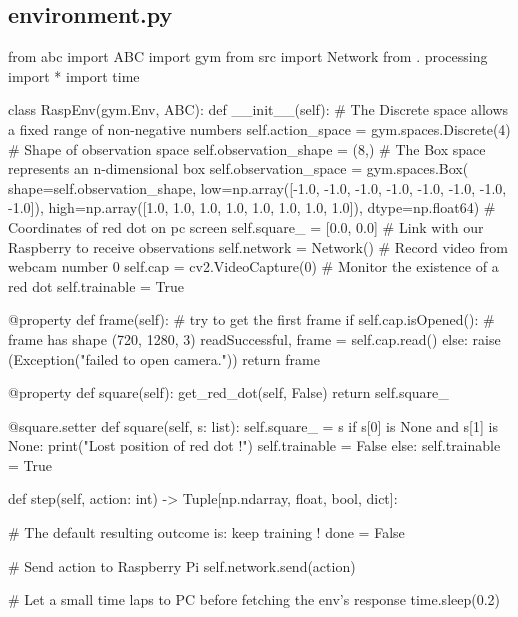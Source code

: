 \subsection{environment.py}
\label{environment}
\begin{pyverbatim}

from abc import ABC
import gym
from src import Network
from . processing import *
import time


class RaspEnv(gym.Env, ABC):
    def __init__(self):
        # The Discrete space allows a fixed range of non-negative numbers
        self.action_space = gym.spaces.Discrete(4)
        # Shape of observation space
        self.observation_shape = (8,)
        # The Box space represents an n-dimensional box
        self.observation_space = gym.spaces.Box(
                 shape=self.observation_shape,
                 low=np.array([-1.0, -1.0, -1.0, -1.0, -1.0, -1.0, -1.0, -1.0]),
                 high=np.array([1.0, 1.0, 1.0, 1.0, 1.0, 1.0, 1.0, 1.0]),
                 dtype=np.float64)
        # Coordinates of red dot on pc screen
        self.square_ = [0.0, 0.0]
        # Link with our Raspberry to receive observations
        self.network = Network()
        # Record video from webcam number 0
        self.cap = cv2.VideoCapture(0)
        # Monitor the existence of a red dot
        self.trainable = True

    @property
    def frame(self):
        # try to get the first frame
        if self.cap.isOpened():
            # frame has shape (720, 1280, 3)
            readSuccessful, frame = self.cap.read()
        else:
            raise (Exception("failed to open camera."))
        return frame

    @property
    def square(self):
        get_red_dot(self, False)
        return self.square_

    @square.setter
    def square(self, s: list):
        self.square_ = s
        if s[0] is None and s[1] is None:
            print("Lost position of red dot !")
            self.trainable = False
        else:
            self.trainable = True

    def step(self, action: int) -> Tuple[np.ndarray, float, bool, dict]:

        # The default resulting outcome is: keep training !
        done = False

        # Send action to Raspberry Pi
        self.network.send(action)

        # Let a small time laps to PC before fetching the env's response
        time.sleep(0.2)


\end{pyverbatim}
